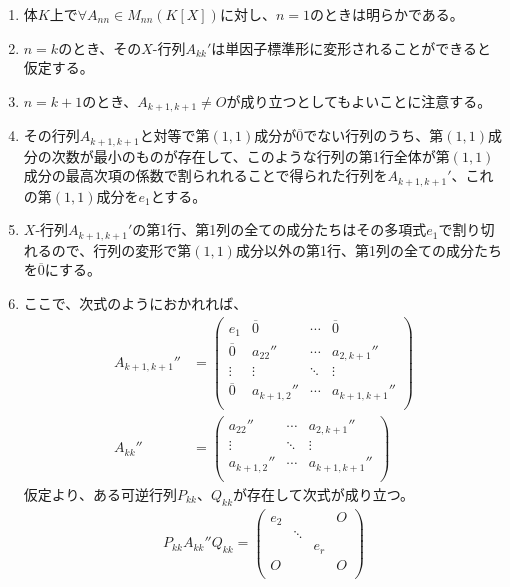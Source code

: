 \documentclass[dvipdfmx]{jsarticle}
\begin{document}
\begin{enumerate}
\item
  体$K$上で$\forall A_{nn} \in M_{nn}\left( K[ X] \right)$に対し、$n = 1$のときは明らかである。
\item
  $n = k$のとき、その$X$-行列$A_{kk}'$は単因子標準形に変形されることができると仮定する。
\item
  $n = k + 1$のとき、$A_{k + 1,k + 1} \neq O$が成り立つとしてもよいことに注意する。
\item
  その行列$A_{k + 1,k + 1}$と対等で第$(1,1)$成分が$\overline{0}$でない行列のうち、第$(1,1)$成分の次数が最小のものが存在して、このような行列の第1行全体が第$(1,1)$成分の最高次項の係数で割られれることで得られた行列を$A_{k + 1,k + 1}'$、これの第$(1,1)$成分を$e_{1}$とする。
\item
  $X$-行列$A_{k + 1,k + 1}'$の第1行、第1列の全ての成分たちはその多項式$e_{1}$で割り切れるので、行列の変形で第$(1,1)$成分以外の第1行、第1列の全ての成分たちを$\overline{0}$にする。
\item
  ここで、次式のようにおかれれば、
\begin{align*}
A_{k + 1,k + 1}'' &= \begin{pmatrix}
e_{1} & \overline{0} & \cdots & \overline{0} \\
\overline{0} & a_{22}'' & \cdots & a_{2,k + 1}'' \\
 \vdots & \vdots & \ddots & \vdots \\
\overline{0} & a_{k + 1,2}'' & \cdots & a_{k + 1,k + 1}'' \\
\end{pmatrix}\\
A_{kk}'' &= \begin{pmatrix}
a_{22}'' & \cdots & a_{2,k + 1}'' \\
 \vdots & \ddots & \vdots \\
a_{k + 1,2}'' & \cdots & a_{k + 1,k + 1}'' \\
\end{pmatrix}
\end{align*}
仮定より、ある可逆行列$P_{kk}$、$Q_{kk}$が存在して次式が成り立つ。
\begin{align*}
P_{kk}A_{kk}''Q_{kk} = \begin{pmatrix}
e_{2} & \  & \  & O \\
\  & \ddots & \  & \  \\
\  & \  & e_{r} & \  \\
O & \  & \  & O \\
\end{pmatrix}
\end{align*}

\end{enumerate}
\end{document}
